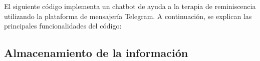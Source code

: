 El siguiente código implementa un chatbot de ayuda a la terapia de reminiscencia utilizando la plataforma de mensajería Telegram. A continuación, se explican las principales funcionalidades del código:

	
	
		
		
	



\subsection{Almacenamiento de la información}

